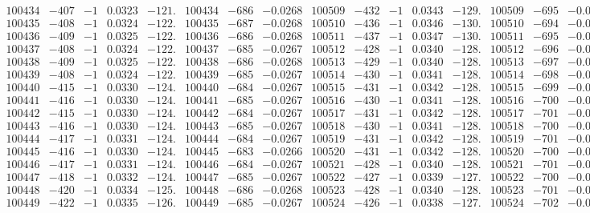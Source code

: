 \documentclass[11pt,reqno,a4letter]{article}
\numberwithin{figure}{section}
\numberwithin{table}{section}
\theoremstyle{plain}
\numberwithin{theorem}{section}
\theoremstyle{definition}
\begin{document}
\begin{table}[ht!]
\begin{equation*}
{\begin{array}{ccccc|ccc||ccccc|ccc}
100434 & -407 & -1 & 0.0323 & -121. & 100434 & -686 & -0.0268 & 100509 & -432 & -1 & 0.0343 & -129. & 100509 & -695 & -0.0271  \\
100435 & -408 & -1 & 0.0324 & -122. & 100435 & -687 & -0.0268 & 100510 & -436 & -1 & 0.0346 & -130. & 100510 & -694 & -0.0271  \\
100436 & -409 & -1 & 0.0325 & -122. & 100436 & -686 & -0.0268 & 100511 & -437 & -1 & 0.0347 & -130. & 100511 & -695 & -0.0271  \\
100437 & -408 & -1 & 0.0324 & -122. & 100437 & -685 & -0.0267 & 100512 & -428 & -1 & 0.0340 & -128. & 100512 & -696 & -0.0271  \\
100438 & -409 & -1 & 0.0325 & -122. & 100438 & -686 & -0.0268 & 100513 & -429 & -1 & 0.0340 & -128. & 100513 & -697 & -0.0272  \\
100439 & -408 & -1 & 0.0324 & -122. & 100439 & -685 & -0.0267 & 100514 & -430 & -1 & 0.0341 & -128. & 100514 & -698 & -0.0272  \\
100440 & -415 & -1 & 0.0330 & -124. & 100440 & -684 & -0.0267 & 100515 & -431 & -1 & 0.0342 & -128. & 100515 & -699 & -0.0273  \\
100441 & -416 & -1 & 0.0330 & -124. & 100441 & -685 & -0.0267 & 100516 & -430 & -1 & 0.0341 & -128. & 100516 & -700 & -0.0273  \\
100442 & -415 & -1 & 0.0330 & -124. & 100442 & -684 & -0.0267 & 100517 & -431 & -1 & 0.0342 & -128. & 100517 & -701 & -0.0273  \\
100443 & -416 & -1 & 0.0330 & -124. & 100443 & -685 & -0.0267 & 100518 & -430 & -1 & 0.0341 & -128. & 100518 & -700 & -0.0273  \\
100444 & -417 & -1 & 0.0331 & -124. & 100444 & -684 & -0.0267 & 100519 & -431 & -1 & 0.0342 & -128. & 100519 & -701 & -0.0273  \\
100445 & -416 & -1 & 0.0330 & -124. & 100445 & -683 & -0.0266 & 100520 & -431 & -1 & 0.0342 & -128. & 100520 & -700 & -0.0273  \\
100446 & -417 & -1 & 0.0331 & -124. & 100446 & -684 & -0.0267 & 100521 & -428 & -1 & 0.0340 & -128. & 100521 & -701 & -0.0273  \\
100447 & -418 & -1 & 0.0332 & -124. & 100447 & -685 & -0.0267 & 100522 & -427 & -1 & 0.0339 & -127. & 100522 & -700 & -0.0273  \\
100448 & -420 & -1 & 0.0334 & -125. & 100448 & -686 & -0.0268 & 100523 & -428 & -1 & 0.0340 & -128. & 100523 & -701 & -0.0273  \\
100449 & -422 & -1 & 0.0335 & -126. & 100449 & -685 & -0.0267 & 100524 & -426 & -1 & 0.0338 & -127. & 100524 & -702 & -0.0274  \\

\end{array}}
\end{equation*}
\end{table}
\end{document}
